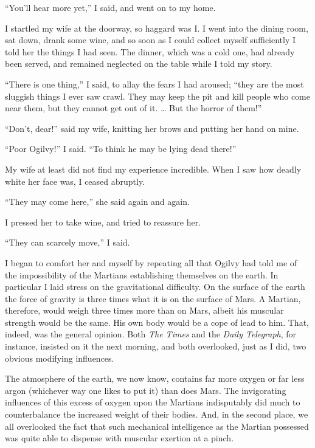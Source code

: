 ``You'll hear more yet,'' I said, and went on to my home.

I startled my wife at the doorway, so haggard was I. I went into
the dining room, sat down, drank some wine, and so soon as I could
collect myself sufficiently I told her the things I had seen. The
dinner, which was a cold one, had already been served, and remained
neglected on the table while I told my story.

``There is one thing,'' I said, to allay the fears I had aroused;
``they are the most sluggish things I ever saw crawl. They may keep
the pit and kill people who come near them, but they cannot get out
of it. \ldots{} But the horror of them!''

``Don't, dear!'' said my wife, knitting her brows and putting her
hand on mine.

``Poor Ogilvy!'' I said. ``To think he may be lying dead there!''

My wife at least did not find my experience incredible. When I saw
how deadly white her face was, I ceased abruptly.

``They may come here,'' she said again and again.

I pressed her to take wine, and tried to reassure her.

``They can scarcely move,'' I said.

I began to comfort her and myself by repeating all that Ogilvy had
told me of the impossibility of the Martians establishing
themselves on the earth. In particular I laid stress on the
gravitational difficulty. On the surface of the earth the force of
gravity is three times what it is on the surface of Mars. A
Martian, therefore, would weigh three times more than on Mars,
albeit his muscular strength would be the same. His own body would
be a cope of lead to him. That, indeed, was the general opinion.
Both \emph{The Times} and the \emph{Daily Telegraph}, for instance,
insisted on it the next morning, and both overlooked, just as I
did, two obvious modifying influences.

The atmosphere of the earth, we now know, contains far more oxygen
or far less argon (whichever way one likes to put it) than does
Mars. The invigorating influences of this excess of oxygen upon the
Martians indisputably did much to counterbalance the increased
weight of their bodies. And, in the second place, we all overlooked
the fact that such mechanical intelligence as the Martian possessed
was quite able to dispense with muscular exertion at a pinch.

